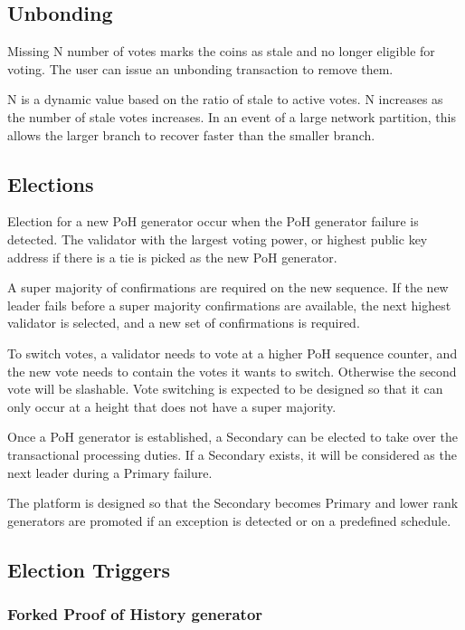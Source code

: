 \documentclass[12pt]{article}
\begin{document}
\subsection{Unbonding}

Missing N number of votes marks the coins as stale and no longer eligible for voting. The user can issue an unbonding transaction to remove them.

N is a dynamic value based on the ratio of stale to active votes. N increases as the number of stale votes increases. In an event of a large network partition, this allows the larger branch to recover faster than the smaller branch.

\subsection{Elections}\label{subsec:elections}
Election for a new PoH generator occur when the PoH generator failure is detected. The validator with the largest voting power, or highest public key address if there is a tie is picked as the new PoH generator.

A super majority of confirmations are required on the new sequence. If the new leader fails before a super majority confirmations are available, the next highest validator is selected, and a new set of confirmations is required.

To switch votes, a validator needs to vote at a higher PoH sequence counter, and the new vote needs to contain the votes it wants to switch. Otherwise the second vote will be slashable. Vote switching is expected to be designed so that it can only occur at a height that does not have a super majority.

Once a PoH generator is established, a Secondary can be elected to take over the transactional processing duties. If a Secondary exists, it will be considered as the next leader during a Primary failure.

The platform is designed so that the Secondary becomes Primary and lower rank generators are promoted if an exception is detected or on a predefined schedule.
\subsection{Election Triggers}
\subsubsection{Forked Proof of History generator}
\end{document}
